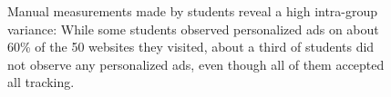 \documentclass{standalonefigure}
\begin{document}
	\begin{figure}
		
		
		\caption{
			Manual measurements made by students reveal a high intra-group variance: While some students observed personalized ads on about 60\% of the 50 websites they visited, about a third of students did not observe any personalized ads, even though all of them accepted all tracking.
		}
		\label{fig/results-manual}
	\end{figure}
\end{document}
